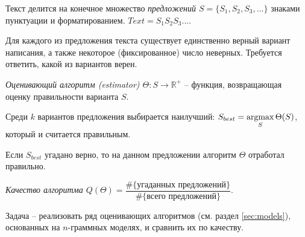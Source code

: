 \begin{definition}
	Текст делится на конечное множество {\textit{предложений $S = \{ S_1, S_2, S_3, ... \}$}} знаками пунктуации и форматированием. $Text = S_1S_2S_3...$.
\end{definition}

Для каждого из предложения текста существует единственно верный вариант написания, а также некоторое (фиксированное) число неверных. Требуется ответить, какой из вариантов верен.

\begin{definition}
	{\textit{Оценивающий алгоритм (estimator) $\Theta : S \rightarrow \mathbb{R}^+ $}} -- функция, возвращающая оценку правильности варианта $S$.
\end{definition}

Среди $k$ вариантов предложения выбирается наилучший: $S_{best} = \operatorname*{argmax}\limits_{S} \Theta(S)$, который и считается правильным.

Если $S_{best}$ угадано верно, то на данном предложении алгоритм $\Theta$ отработал правильно.

\begin{definition}
	{\textit{Качество алгоритма $Q(\Theta) = \dfrac{\#\{ \text{угаданных предложений} \}}{\#\{ \text{всего предложений} \}}$}}.
\end{definition}

Задача -- реализовать ряд оценивающих алгоритмов (см. раздел \cref{sec:models}), основанных на $n$-граммных моделях, и сравнить их по качеству.